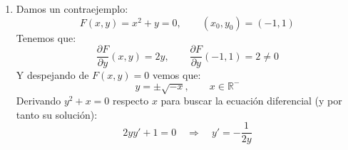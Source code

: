 \begin{ejercicio}
\begin{enumerate}[label=\alph*)]
            \begin{equation*}
                y' = \frac{-\frac{\partial F(x,y)}{\partial y}}{\frac{\partial F}{\partial y}(x,y)}, \qquad y(x_0) = y_0
            \end{equation*}
            Como $F$ es de clase $C^1$ tenemos que es continua y como su parcial es distinta de cero, podemos exigir que existe un entorno $\Omega$ abierto y conexo de $(x_0,y_0)$ donde tengamos el denominador no nulo. Vemos que el campo es continuo como cociente de continuos, que $(x_0,y_0) \in \Omega^\circ$ y aplicando el Teorema de Cauchy-Peano conseguimos una solución $y:I\to \mathbb{R}$  de forma que $Gr(y)\subset \Omega$ y cumpliendo la ecuación diferencial. Ahora se continuaría hacia detrás.
        \item Damos un contraejemplo:
            \begin{equation*}
                F(x,y) = x^2+y = 0, \qquad (x_0,y_0) = (-1,1)
            \end{equation*}
            Tenemos que:
            \begin{equation*}
                \frac{\partial F}{\partial y}(x,y) = 2y, \qquad \frac{\partial F}{\partial y}(-1,1) = 2 \neq 0
            \end{equation*}
            Y despejando de $F(x,y) = 0$ vemos que:
            \begin{equation*}
                y = \pm \sqrt{-x}, \qquad x\in \mathbb{R}^-
            \end{equation*}
            Derivando $y^2+x=0$ respecto $x$ para buscar la ecuación diferencial (y por tanto su solución):
            \begin{equation*}
                2yy'+1 = 0 \quad\Longrightarrow\quad y' = -\frac{1}{2y}
            \end{equation*}
    \end{enumerate}
\end{ejercicio}

